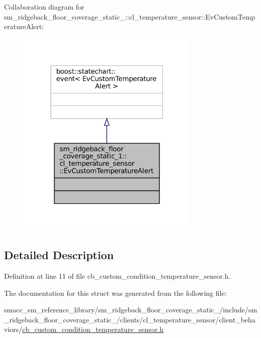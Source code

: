 Collaboration diagram for sm\+\_\+ridgeback\+\_\+floor\+\_\+coverage\+\_\+static\+\_\+:\+:cl\+\_\+temperature\+\_\+sensor\+:\+:Ev\+Custom\+Temperature\+Alert\+:
\nopagebreak
\begin{figure}[H]
\begin{center}
\leavevmode
\includegraphics[width=247pt]{structsm__ridgeback__floor__coverage__static__1_1_1cl__temperature__sensor_1_1EvCustomTemperatureAlert__coll__graph}
\end{center}
\end{figure}


\subsection{Detailed Description}


Definition at line 11 of file cb\+\_\+custom\+\_\+condition\+\_\+temperature\+\_\+sensor.\+h.



The documentation for this struct was generated from the following file\+:\begin{DoxyCompactItemize}
\item 
smacc\+\_\+sm\+\_\+reference\+\_\+library/sm\+\_\+ridgeback\+\_\+floor\+\_\+coverage\+\_\+static\+\_/include/sm\+\_\+ridgeback\+\_\+floor\+\_\+coverage\+\_\+static\+\_/clients/cl\+\_\+temperature\+\_\+sensor/client\+\_\+behaviors/\hyperlink{sm__ridgeback__floor__coverage__static__1_2include_2sm__ridgeback__floor__coverage__static__1_2c0d76777f012e3a902686ca15b8e9cfe7}{cb\+\_\+custom\+\_\+condition\+\_\+temperature\+\_\+sensor.\+h}\end{DoxyCompactItemize}
